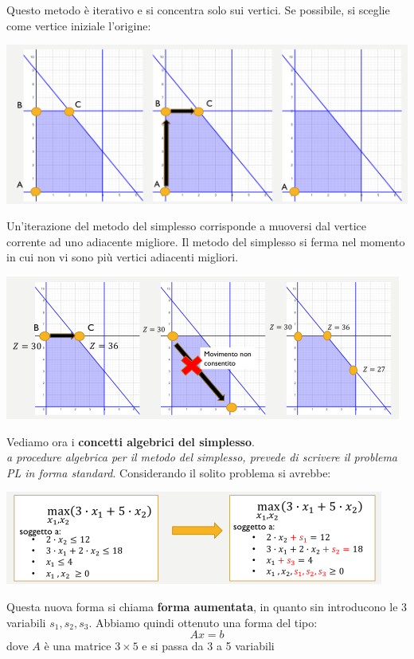 \documentclass[a4paper,12pt, oneside]{book}
\begin{document}
Questo metodo è iterativo e si concentra solo sui vertici. Se
possibile, si sceglie come vertice iniziale l’origine:
\begin{center}
  \includegraphics[scale = 0.8]{img/simp14.png}
\end{center}
Un'iterazione del metodo del simplesso corrisponde a muoversi dal
vertice corrente ad uno adiacente migliore. Il metodo del simplesso si
ferma nel momento in cui non vi sono più vertici adiacenti migliori.
\begin{center}
  \includegraphics[scale = 0.8]{img/simp15.png}
\end{center}
Vediamo ora i \textbf{concetti algebrici del simplesso}.\\
\textit{a procedure algebrica per il metodo del simplesso, prevede di
  scrivere il problema PL in forma standard}. Considerando il solito
problema si avrebbe:
\begin{center}
  \includegraphics[scale = 1]{img/simp16.png}
\end{center}
Questa nuova forma si chiama \textbf{forma aumentata}, in quanto sin
introducono le 3 variabili $s_1, s_2, s_3$.
\newpage
Abbiamo quindi ottenuto una forma del tipo:
\[Ax=b\]
dove $A$ è una matrice $3\times 5$ e si passa da 3 a 5 variabili
\end{document}
